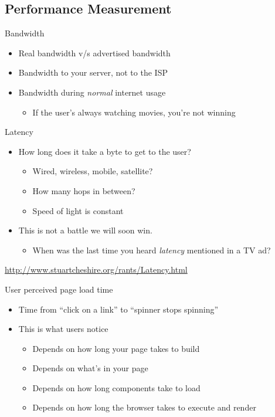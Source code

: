 \documentclass{beamer}
\begin{document}
\subsection{Performance Measurement}
\begin{frame}{Bandwidth}
  \begin{itemize}
  \item Real bandwidth v/s advertised bandwidth
  \item Bandwidth to your server, not to the ISP
  \item Bandwidth during \textit{normal} internet usage
    \begin{itemize}
    \item<2-> If the user's always watching movies, you're not winning
    \end{itemize}
  \end{itemize}
\end{frame}

\begin{frame}{Latency}
  \begin{itemize}
  \item How long does it take a byte to get to the user?
    \begin{itemize}
    \item<2-> Wired, wireless, mobile, satellite?
    \item<2-> How many hops in between?
    \item<2-> Speed of light is constant
    \end{itemize}
  \item<3-> This is not a battle we will soon win.
    \begin{itemize}
    \item When was the last time you heard \textit{latency} mentioned in a TV ad?
    \end{itemize}
  \end{itemize}
  \href{http://www.stuartcheshire.org/rants/Latency.html}{\scriptsize{http://www.stuartcheshire.org/rants/Latency.html}}
\end{frame}

\begin{frame}{User perceived page load time}
  \begin{itemize}
  \item Time from ``click on a link'' to ``spinner stops spinning''
  \item This is what users notice
    \begin{itemize}
    \item Depends on how long your page takes to build
    \item Depends on what's in your page
    \item Depends on how long components take to load
    \item Depends on how long the browser takes to execute and render
    \end{itemize}
  \end{itemize}
\end{frame}
\end{document}
